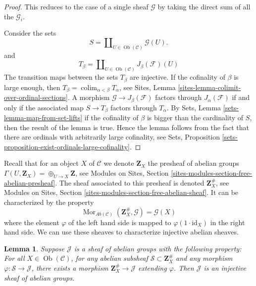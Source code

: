 \documentclass{stacks-project}
\theoremstyle{plain}
\newtheorem{lemma}[subsection]{Lemma}
\theoremstyle{definition}
\theoremstyle{remark}
\numberwithin{equation}{subsection}
\def\colim{\mathop{\mathrm{colim}}\nolimits}
\def\Mor{\mathop{\mathrm{Mor}}\nolimits}
\def\Ob{\mathop{\mathrm{Ob}}\nolimits}
\begin{document}
\begin{proof}
This reduces to the case of a single sheaf $\mathcal{G}$
by taking the direct sum of all the $\mathcal{G}_i$.

\medskip\noindent
Consider the sets
$$
S = \coprod\nolimits_{U \in \Ob(\mathcal{C})} \mathcal{G}(U).
$$
and
$$
T_\beta
=
\coprod\nolimits_{U \in \Ob(\mathcal{C})} J_\beta(\mathcal{F})(U)
$$
The transition maps between the sets $T_\beta$ are injective.
If the cofinality of $\beta$ is large enough, then
$T_\beta = \colim_{\alpha < \beta} T_\alpha$, see
Sites, Lemma \ref{sites-lemma-colimit-over-ordinal-sections}.
A morphism $\mathcal{G} \to J_\beta(\mathcal{F})$ factors
through $J_\alpha(\mathcal{F})$ if and only if
the associated map $S \to T_\beta$ factors through $T_\alpha$.
By
Sets, Lemma \ref{sets-lemma-map-from-set-lifts}
if the cofinality of $\beta$ is bigger than the cardinality
of $S$, then the result of the lemma is true. Hence the lemma
follows from the fact that there are ordinals with arbitrarily
large cofinality, see
Sets, Proposition \ref{sets-proposition-exist-ordinals-large-cofinality}.
\end{proof}

\noindent
Recall that for an object $X$ of $\mathcal{C}$ we denote $\mathbf{Z}_X$
the presheaf of abelian groups $\Gamma(U, \mathbf{Z}_X) =
\oplus_{U \to X} \mathbf{Z}$, see
Modules on Sites, Section \ref{sites-modules-section-free-abelian-presheaf}.
The sheaf associated to this presheaf
is denoted $\mathbf{Z}_X^\#$, see
Modules on Sites, Section \ref{sites-modules-section-free-abelian-sheaf}.
It can be characterized by
the property
\begin{equation}
\label{equation-free-sheaf-on}
\Mor_{\textit{Ab}(\mathcal{C})}(\mathbf{Z}_X^\#, \mathcal{G})
=
\mathcal{G}(X)
\end{equation}
where the element $\varphi$ of the left hand side is mapped
to $\varphi(1 \cdot \text{id}_X)$ in the right hand side. We can use these
sheaves to characterize injective abelian sheaves.

\begin{lemma}
\label{lemma-characterize-injectives}
Suppose $\mathcal{J}$ is a sheaf of abelian groups with the following
property: For all $X\in \Ob(\mathcal{C})$, for any abelian subsheaf
$\mathcal{S} \subset \mathbf{Z}_X^\#$ and any morphism
$\varphi : \mathcal{S} \to \mathcal{J}$, there exists a morphism
$\mathbf{Z}_X^\# \to \mathcal{J}$ extending $\varphi$.
Then $\mathcal{J}$ is an injective sheaf of abelian groups.
\end{lemma}
\end{document}

